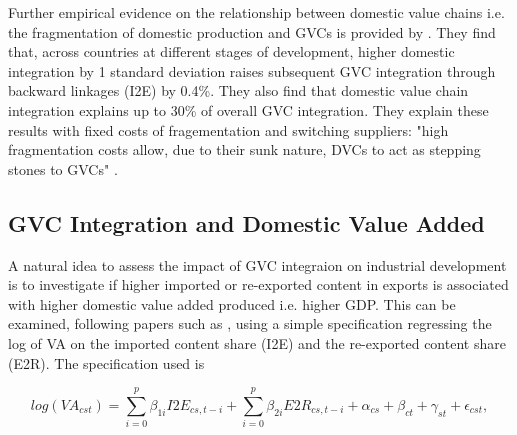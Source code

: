 \documentclass[a4paper]{article}
\begin{document}



Further empirical evidence on the relationship between domestic value chains i.e. the fragmentation of domestic production and GVCs is provided by \citet{beverelli2019domestic}. They find that, across countries at different stages of development, higher domestic integration by 1 standard deviation raises subsequent GVC integration through backward linkages (I2E) by 0.4\%. They also find that domestic value chain integration explains up to 30\% of overall GVC integration. They explain these results with fixed costs of fragementation and switching suppliers: "high fragmentation costs allow, due to their sunk nature, DVCs to act as stepping stones to GVCs" \citep{beverelli2019domestic}. %

\subsection{GVC Integration and Domestic Value Added}

A natural idea to assess the impact of GVC integraion on industrial development is to investigate if higher imported or re-exported content in exports is associated with higher domestic value added produced i.e. higher GDP. This can be examined, following papers such as \citet{kummritz2015global}, using a simple specification regressing the log of VA on the imported content share (I2E) and the re-exported content share (E2R). The specification used is

\begin{equation} \label{eq:GROWTH_HDFE}
log(VA_{cst}) = \sum_{i=0}^p \beta_{1i} I2E_{cs,t-i} + \sum_{i = 0}^p \beta_{2i} E2R_{cs,t-i}  + \alpha_{cs} + \beta_{ct} +\gamma_{st} + \epsilon_{cst},
\end{equation}
\end{document}
